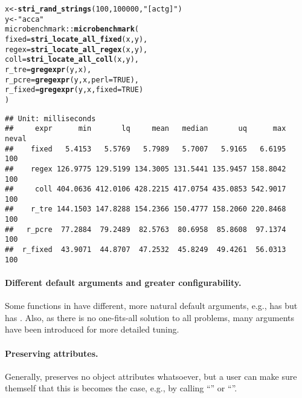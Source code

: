 \documentclass[nojss]{jss}\usepackage[]{graphicx}\usepackage[]{xcolor}
\makeatletter
\newcommand{\hlnum}[1]{\textcolor[rgb]{0.686,0.059,0.569}{#1}}%
\newcommand{\hlstr}[1]{\textcolor[rgb]{0.192,0.494,0.8}{#1}}%
\newcommand{\hlopt}[1]{\textcolor[rgb]{0,0,0}{#1}}%
\newcommand{\hlstd}[1]{\textcolor[rgb]{0.345,0.345,0.345}{#1}}%
\newcommand{\hlkwb}[1]{\textcolor[rgb]{0.69,0.353,0.396}{#1}}%
\newcommand{\hlkwc}[1]{\textcolor[rgb]{0.333,0.667,0.333}{#1}}%
\newcommand{\hlkwd}[1]{\textcolor[rgb]{0.737,0.353,0.396}{\textbf{#1}}}%
\newenvironment{kframe}{%
 \def\at@end@of@kframe{}%
 \ifinner\ifhmode%
  \def\at@end@of@kframe{\end{minipage}}%
  \begin{minipage}{\columnwidth}%
 \fi\fi%
 \def\FrameCommand##1{\hskip\@totalleftmargin \hskip-\fboxsep
 \colorbox{shadecolor}{##1}\hskip-\fboxsep
     \hskip-\linewidth \hskip-\@totalleftmargin \hskip\columnwidth}%
 \MakeFramed {\advance\hsize-\width
   \@totalleftmargin\z@ \linewidth\hsize
   \@setminipage}}%
 {\par\unskip\endMakeFramed%
 \at@end@of@kframe}
\newenvironment{knitrout}{}{} %
\makeatother
\begin{document}
\begin{knitrout}
\color{fgcolor}\begin{kframe}
\begin{alltt}
\hlstd{x} \hlkwb{<-} \hlkwd{stri_rand_strings}\hlstd{(}\hlnum{100}\hlstd{,} \hlnum{100000}\hlstd{,} \hlstr{"[actg]"}\hlstd{)}
\hlstd{y} \hlkwb{<-} \hlstr{"acca"}
\hlstd{microbenchmark}\hlopt{::}\hlkwd{microbenchmark}\hlstd{(}
  \hlkwc{fixed}\hlstd{=}\hlkwd{stri_locate_all_fixed}\hlstd{(x, y),}
  \hlkwc{regex}\hlstd{=}\hlkwd{stri_locate_all_regex}\hlstd{(x, y),}
  \hlkwc{coll}\hlstd{=}\hlkwd{stri_locate_all_coll}\hlstd{(x, y),}
  \hlkwc{r_tre}\hlstd{=}\hlkwd{gregexpr}\hlstd{(y, x),}
  \hlkwc{r_pcre}\hlstd{=}\hlkwd{gregexpr}\hlstd{(y, x,} \hlkwc{perl}\hlstd{=}\hlnum{TRUE}\hlstd{),}
  \hlkwc{r_fixed}\hlstd{=}\hlkwd{gregexpr}\hlstd{(y, x,} \hlkwc{fixed}\hlstd{=}\hlnum{TRUE}\hlstd{)}
\hlstd{)}
\end{alltt}
\begin{verbatim}
## Unit: milliseconds
##     expr      min       lq     mean   median       uq      max neval
##    fixed   5.4153   5.5769   5.7989   5.7007   5.9165   6.6195   100
##    regex 126.9775 129.5199 134.3005 131.5441 135.9457 158.8042   100
##     coll 404.0636 412.0106 428.2215 417.0754 435.0853 542.9017   100
##    r_tre 144.1503 147.8288 154.2366 150.4777 158.2060 220.8468   100
##   r_pcre  77.2884  79.2489  82.5763  80.6958  85.8608  97.1374   100
##  r_fixed  43.9071  44.8707  47.2532  45.8249  49.4261  56.0313   100
\end{verbatim}
\end{kframe}
\end{knitrout}


\paragraph{Different default arguments and greater configurability.}
Some functions in  have different,
more natural default arguments,
e.g.,  has  but
 has .
Also, as there is no one-fits-all solution to all problems,
many arguments have been introduced for more detailed tuning.

\paragraph{Preserving attributes.}
Generally,  preserves no object attributes
whatsoever, but a user can make sure themself
that this is becomes the case, e.g., by calling
``''
or ``''.
\end{document}
